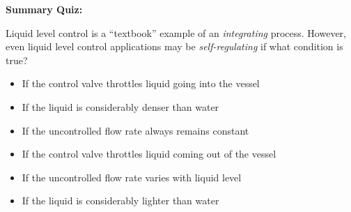 \vfil \eject

\noindent
{\bf Summary Quiz:}

Liquid level control is a ``textbook'' example of an {\it integrating} process.  However, even liquid level control applications may be {\it self-regulating} if what condition is true?

\begin{itemize}
\item{} If the control valve throttles liquid going into the vessel
\vskip 5pt 
\item{} If the liquid is considerably denser than water
\vskip 5pt 
\item{} If the uncontrolled flow rate always remains constant
\vskip 5pt 
\item{} If the control valve throttles liquid coming out of the vessel 
\vskip 5pt 
\item{} If the uncontrolled flow rate varies with liquid level
\vskip 5pt 
\item{} If the liquid is considerably lighter than water 
\end{itemize}




